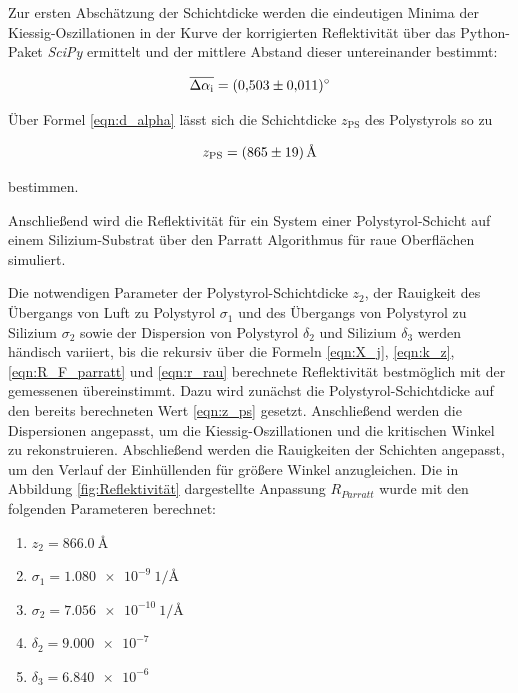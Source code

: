     \FloatBarrier

    Zur ersten Abschätzung der Schichtdicke werden die eindeutigen Minima der Kiessig-Oszillationen in der Kurve der korrigierten Reflektivität über das Python-Paket \textit{SciPy} ermittelt und der 
    mittlere Abstand dieser untereinander bestimmt:
    
    \begin{equation*}
      \overline{\Delta \alpha_{\text{i}}} = \SI{0.503+-0.011}{\degree}
    \end{equation*}
    
    Über Formel \ref{eqn:d_alpha} lässt sich die Schichtdicke $z_{\text{PS}}$ des Polystyrols so zu

    \begin{equation}
      z_{\text{PS}} = \SI{865+-19}{\angstrom}
      \label{eqn:z_ps}
    \end{equation}

    bestimmen.

    Anschließend wird die Reflektivität für ein System einer Polystyrol-Schicht auf einem Silizium-Substrat über den Parratt Algorithmus für raue Oberflächen simuliert.
    
    
    Die notwendigen Parameter der Polystyrol-Schichtdicke $z_2$, der Rauigkeit des Übergangs von Luft zu Polystyrol $\sigma_1$ und des Übergangs von Polystyrol zu Silizium $\sigma_2$ sowie der Dispersion von
    Polystyrol $\delta_2$ und Silizium $\delta_3$ werden händisch variiert, bis die rekursiv über die Formeln \ref{eqn:X_j}, \ref{eqn:k_z}, \ref{eqn:R_F_parratt} und \ref{eqn:r_rau} berechnete Reflektivität 
    bestmöglich mit der gemessenen übereinstimmt. Dazu wird 
    zunächst die Polystyrol-Schichtdicke auf den bereits berechneten Wert \ref{eqn:z_ps} gesetzt. Anschließend werden die Dispersionen angepasst, um die Kiessig-Oszillationen und die kritischen Winkel
    zu rekonstruieren. Abschließend werden die Rauigkeiten der Schichten angepasst, um den Verlauf der Einhüllenden für größere Winkel anzugleichen. Die in Abbildung \ref{fig:Reflektivität} dargestellte 
    Anpassung $R_{Parratt}$ wurde mit den folgenden Parameteren berechnet:
    
    \begin{enumerate}
      \item $z_2=\SI{866.0}{\angstrom}$
      \item $\sigma_1=\SI{1.080e-9}{1\per\angstrom}$
      \item $\sigma_2=\SI{7.056e-10}{1\per\angstrom}$
      \item $\delta_2=\SI{9.000e-7}{}$
      \item $\delta_3=\SI{6.840e-6}{}$
    \end{enumerate}

